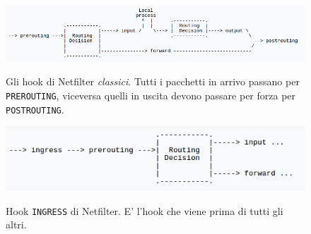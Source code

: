 \begin{figure}
  \includegraphics[scale=0.5]{img/NetfilterHooks}
  \label{fig:netfiler-hooks}
  \caption[Hook di Netfiler]{Gli hook di Netfilter \textit{classici}. Tutti i
  pacchetti in arrivo passano per \texttt{PREROUTING}, viceversa quelli in
  uscita devono passare per forza per \texttt{POSTROUTING}.}
\end{figure}


\begin{figure}
  \includegraphics[scale=0.5]{img/NetfilterIngress}
  \label{fig:ingress-hooks}
  \caption[Hook \texttt{INGRESS}]{Hook \texttt{INGRESS} di Netfilter. E' l'hook
  che viene prima di tutti gli altri.}
\end{figure}

